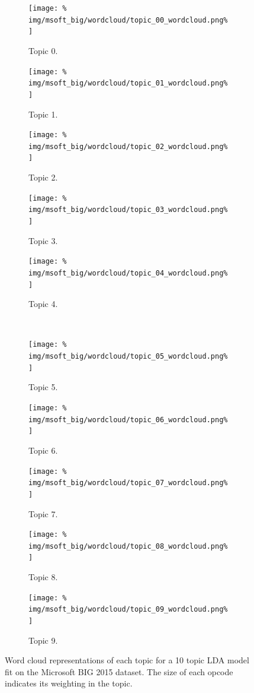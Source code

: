 \documentclass[../stegner_thesis.tex]{subfiles}
\begin{document}
\begin{figure}[htb]
	\centering
	\begin{subfigure}[c]{0.18\textwidth}
		\centering
		\texttt{[image: \%
			img/msoft\_big/wordcloud/topic\_00\_wordcloud.png\%
		]}
		\caption{Topic 0.}%
		\label{fig:wordcloud_topic_0}
	\end{subfigure}
	\hfill
	\begin{subfigure}[c]{0.18\textwidth}
		\centering
		\texttt{[image: \%
			img/msoft\_big/wordcloud/topic\_01\_wordcloud.png\%
		]}
		\caption{Topic 1.}%
		\label{fig:wordcloud_topic_1}
	\end{subfigure}
	\hfill
	\begin{subfigure}[c]{0.18\textwidth}
		\centering
		\texttt{[image: \%
			img/msoft\_big/wordcloud/topic\_02\_wordcloud.png\%
		]}
		\caption{Topic 2.}%
		\label{fig:wordcloud_topic_2}
	\end{subfigure}
	\hfill
	\begin{subfigure}[c]{0.18\textwidth}
		\centering
		\texttt{[image: \%
			img/msoft\_big/wordcloud/topic\_03\_wordcloud.png\%
		]}
		\caption{Topic 3.}%
		\label{fig:wordcloud_topic_3}
	\end{subfigure}
	\hfill
	\begin{subfigure}[c]{0.18\textwidth}
		\centering
		\texttt{[image: \%
			img/msoft\_big/wordcloud/topic\_04\_wordcloud.png\%
		]}
		\caption{Topic 4.}%
		\label{fig:wordcloud_topic_4}
	\end{subfigure} \\
	\begin{subfigure}[c]{0.18\textwidth}
		\centering
		\texttt{[image: \%
			img/msoft\_big/wordcloud/topic\_05\_wordcloud.png\%
		]}
		\caption{Topic 5.}%
		\label{fig:wordcloud_topic_5}
	\end{subfigure}
	\hfill
	\begin{subfigure}[c]{0.18\textwidth}
		\centering
		\texttt{[image: \%
			img/msoft\_big/wordcloud/topic\_06\_wordcloud.png\%
		]}
		\caption{Topic 6.}%
		\label{fig:wordcloud_topic_6}
	\end{subfigure}
	\hfill
	\begin{subfigure}[c]{0.18\textwidth}
		\centering
		\texttt{[image: \%
			img/msoft\_big/wordcloud/topic\_07\_wordcloud.png\%
		]}
		\caption{Topic 7.}%
		\label{fig:wordcloud_topic_7}
	\end{subfigure}
	\hfill
	\begin{subfigure}[c]{0.18\textwidth}
		\centering
		\texttt{[image: \%
			img/msoft\_big/wordcloud/topic\_08\_wordcloud.png\%
		]}
		\caption{Topic 8.}%
		\label{fig:wordcloud_topic_8}
	\end{subfigure}
	\hfill
	\begin{subfigure}[c]{0.18\textwidth}
		\centering
		\texttt{[image: \%
			img/msoft\_big/wordcloud/topic\_09\_wordcloud.png\%
		]}
		\caption{Topic 9.}%
		\label{fig:wordcloud_topic_9}
	\end{subfigure}
	\caption[Word cloud representations of LDA topics]{%
		Word cloud representations of each topic for a 10 topic LDA model fit on
		the Microsoft BIG 2015 dataset.
		The size of each opcode indicates its weighting in the topic.
	}%
	\label{fig:wordcloud}
\end{figure}
\end{document}
